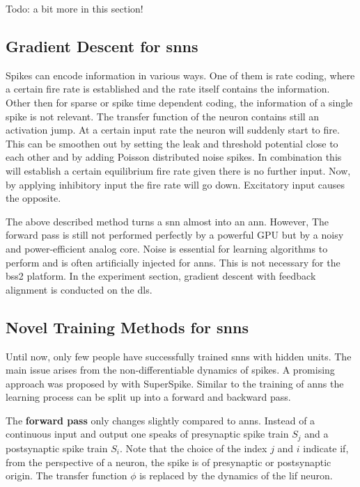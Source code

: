Todo: a bit more in this section!



\subsection{Gradient Descent for \glspl{snn}}

Spikes can encode information in various ways. One of them is rate coding, where a certain fire rate is established and the rate itself contains the information. Other then for sparse or spike time dependent coding, the information of a single spike is not relevant. The transfer function of the neuron contains still an activation jump. At a certain input rate the neuron will suddenly start to fire. This can be smoothen out by setting the leak and threshold potential close to each other and by adding Poisson distributed noise spikes. In combination this will establish a certain equilibrium fire rate given there is no further input. Now, by applying inhibitory input the fire rate will go down. Excitatory input causes the opposite.

The above described method turns a \gls{snn} almost into an \gls{ann}. However, The forward pass is still not performed perfectly by a powerful GPU but by a noisy and power-efficient analog core. Noise is essential for learning algorithms to perform and is often artificially injected for \glspl{ann}. This is not necessary for the \gls{bss2} platform. In the experiment section, gradient descent with feedback alignment is conducted on the \gls{dls}.


\subsection{Novel Training Methods for \glspl{snn}}
\label{superspike}


Until now, only few people have successfully trained \glspl{snn} with hidden units. The main issue arises from the non-differentiable dynamics of spikes. A promising approach was proposed by \cite{zenke2018superspike} with SuperSpike. Similar to the training of \glspl{ann} the learning process can be split up into a forward and backward pass. 

The \textbf{forward pass} only changes slightly compared to \glspl{ann}. Instead of a continuous input and output one speaks of presynaptic spike train $S_j$ and a postsynaptic spike train $S_i$. Note that the choice of the index $j$ and $i$ indicate if, from the perspective of a neuron, the spike is of presynaptic or postsynaptic origin. The transfer function $\phi$ is replaced by the dynamics of the \gls{lif} neuron.

